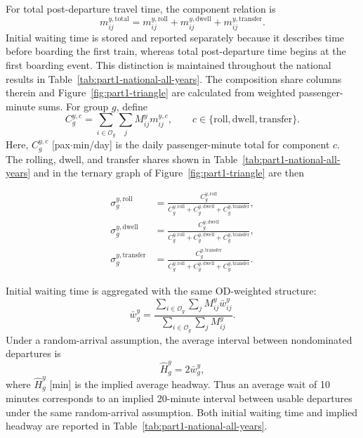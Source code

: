 \documentclass[preprint,12pt]{elsarticle}
\begin{document}
For total post-departure travel time, the component relation is
\begin{equation}
  m^{y,\mathrm{total}}_{ij}
  =
  m^{y,\mathrm{roll}}_{ij}
  +
  m^{y,\mathrm{dwell}}_{ij}
  +
  m^{y,\mathrm{transfer}}_{ij}.
  \label{eq:part1-total-time-components}
\end{equation}
Initial waiting time is stored and reported separately because it describes time before boarding the first train, whereas total post-departure time begins at the first boarding event. This distinction is maintained throughout the national results in Table~\ref{tab:part1-national-all-years}. The composition share columns therein and Figure~\ref{fig:part1-triangle} are calculated from weighted passenger-minute sums. For group $g$, define
\begin{equation}
  C^{y,c}_g
  =
  \sum_{i\in\mathcal{O}_g}\sum_j
  M^y_{ij}m^{y,c}_{ij},
  \qquad
  c\in\{\mathrm{roll},\mathrm{dwell},\mathrm{transfer}\}.
  \label{eq:part1-component-passenger-minutes}
\end{equation}
Here, $C^{y,c}_g$ [pax$\cdot$min/day] is the daily passenger-minute total for component $c$. The rolling, dwell, and transfer shares shown in Table~\ref{tab:part1-national-all-years} and in the ternary graph of Figure~\ref{fig:part1-triangle} are then

\begin{equation}
\begin{aligned}
  \sigma^{y,\mathrm{roll}}_g
  &=
  \frac{C^{y,\mathrm{roll}}_g}
  {C^{y,\mathrm{roll}}_g+C^{y,\mathrm{dwell}}_g+C^{y,\mathrm{transfer}}_g},
  \\[6pt]
  \sigma^{y,\mathrm{dwell}}_g
  &=
  \frac{C^{y,\mathrm{dwell}}_g}
  {C^{y,\mathrm{roll}}_g+C^{y,\mathrm{dwell}}_g+C^{y,\mathrm{transfer}}_g},
  \\[6pt]
  \sigma^{y,\mathrm{transfer}}_g
  &=
  \frac{C^{y,\mathrm{transfer}}_g}
  {C^{y,\mathrm{roll}}_g+C^{y,\mathrm{dwell}}_g+C^{y,\mathrm{transfer}}_g}.
\end{aligned}
\label{eq:part1-component-shares}
\end{equation}

Initial waiting time is aggregated with the same OD-weighted structure:
\begin{equation}
  \bar w^y_g
  =
  \frac{
    \sum_{i\in\mathcal{O}_g}\sum_j M^y_{ij}\bar w^y_{ij}
  }{
    \sum_{i\in\mathcal{O}_g}\sum_j M^y_{ij}
  }.
  \label{eq:part1-weighted-wait}
\end{equation}
Under a random-arrival assumption, the average interval between nondominated departures is
\begin{equation}
  \widehat H^y_g = 2\bar w^y_g,
  \label{eq:part1-implied-headway}
\end{equation}
where $\widehat H^y_g$ [min] is the implied average headway. Thus an average wait of 10 minutes corresponds to an implied 20-minute interval between usable departures under the same random-arrival assumption. Both initial waiting time and implied headway are reported in Table~\ref{tab:part1-national-all-years}.
\end{document}
